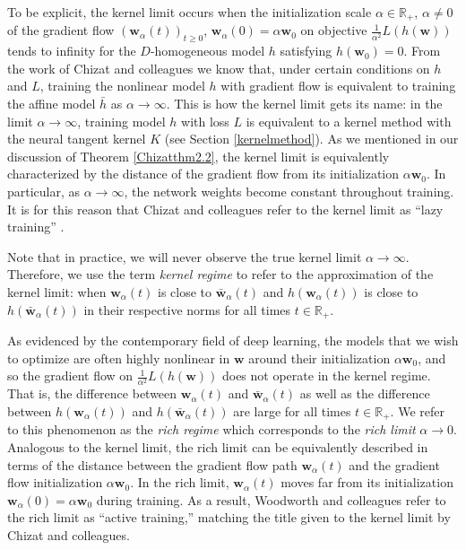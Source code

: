 \documentclass{article}
\begin{document}
To be explicit, the kernel limit occurs when the initialization scale $\alpha \in \mathbb{R}_+$, $\alpha \neq 0$ of the gradient flow $(\boldsymbol{w}_{\alpha}(t))_{t \geq 0}$, $\boldsymbol{w}_{\alpha}(0) = \alpha \boldsymbol{w}_0$ on objective $\frac{1}{\alpha^2}L(h(\boldsymbol{w}))$ tends to infinity for the $D$-homogeneous model $h$ satisfying $h(\boldsymbol{w}_0) = 0$. From the work of Chizat and colleagues we know that, under certain conditions on $h$ and $L$, training the nonlinear model $h$ with gradient flow is equivalent to training the affine model $\bar{h}$ as $\alpha \rightarrow \infty$. This is how the kernel limit gets its name: in the limit $\alpha \rightarrow \infty$, training model $h$ with loss $L$ is equivalent to a kernel method with the neural tangent kernel $K$ (see Section \ref{kernelmethod}). As we mentioned in our discussion of Theorem \ref{Chizatthm2.2}, the kernel limit is equivalently characterized by the distance of the gradient flow from its initialization $\alpha \boldsymbol{w}_0$. In particular, as $\alpha \rightarrow \infty$, the network weights become constant throughout training. It is for this reason that Chizat and colleagues refer to the kernel limit as \enquote{lazy training} \cite{chizat2018lazy}. 

Note that in practice, we will never observe the true kernel limit $\alpha \rightarrow \infty$. Therefore, we use the term \textit{kernel regime} to refer to the approximation of the kernel limit: when $\boldsymbol{w}_{\alpha}(t)$ is close to $\boldsymbol{\bar{w}}_{\alpha}(t)$ and $h(\boldsymbol{w}_{\alpha}(t))$ is close to $h(\boldsymbol{\bar{w}}_{\alpha}(t))$ in their respective norms for all times $t \in \mathbb{R}_+$.

As evidenced by the contemporary field of deep learning, the models that we wish to optimize are often highly nonlinear in $\boldsymbol{w}$ around their initialization $\alpha\boldsymbol{w}_0$, and so the gradient flow on $\frac{1}{\alpha^2}L(h(\boldsymbol{w}))$ does not operate in the kernel regime. That is, the difference between $\boldsymbol{w}_{\alpha}(t)$ and $\boldsymbol{\bar{w}}_{\alpha}(t)$ as well as the difference between $h(\boldsymbol{w}_{\alpha}(t))$ and $h(\boldsymbol{\bar{w}}_{\alpha}(t))$ are large for all times $t \in \mathbb{R}_+$. We refer to this phenomenon as the \textit{rich regime} which corresponds to the \textit{rich limit} $\alpha \rightarrow 0$. Analogous to the kernel limit, the rich limit can be equivalently described in terms of the distance between the gradient flow path $\boldsymbol{w}_{\alpha}(t)$ and the gradient flow initialization $\alpha\boldsymbol{w}_0$. In the rich limit, $\boldsymbol{w}_{\alpha}(t)$ moves far from its initialization $\boldsymbol{w}_{\alpha}(0) = \alpha \boldsymbol{w}_0$ during training. As a result, Woodworth and colleagues refer to the rich limit as \enquote{active training,} matching the title given to the kernel limit by Chizat and colleagues.
\end{document}
